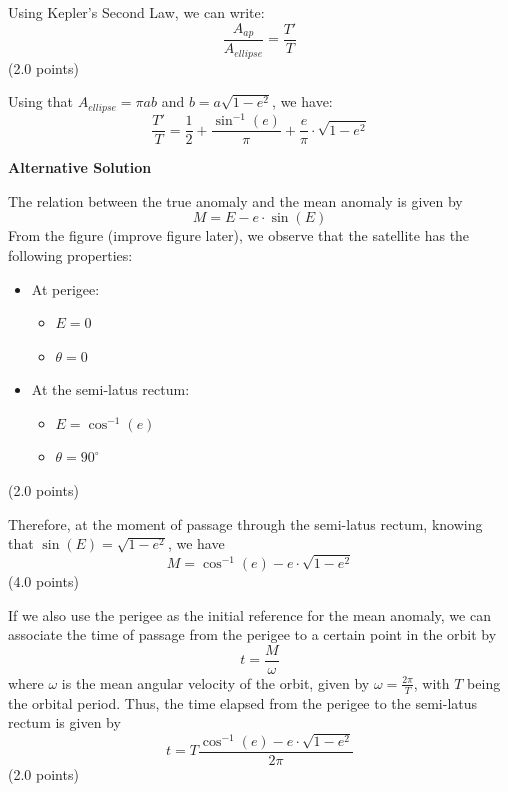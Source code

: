 \begin{description}
  Using Kepler's Second Law, we can write:
  \[
    \frac{A_{ap}}{A_{ellipse}} = \frac{T'}{T}
  \]
  \hfill(2.0 points)

  Using that $A_{ellipse} = \pi ab$ and $b = a\sqrt{1 - e^2}$, we have:
  \[
    \boxed{\frac{T'}{T} = \frac{1}{2} + \frac{\sin^{-1}(e)}{\pi}
      + \frac{e}{\pi}\cdot\sqrt{1 - e^2}}
  \]

  \textbf{Alternative Solution}


  The relation between the true anomaly and the mean anomaly is given by
  \[
    M = E - e\cdot\sin(E)
  \]
  From the figure (improve figure later), we observe that the satellite has %
  the following properties:
  \begin{itemize}
    \item At perigee:
      \begin{itemize}
        \item $E = 0$
        \item $\theta = 0$
      \end{itemize}
    \item At the semi-latus rectum:
      \begin{itemize}
        \item $E = \cos^{-1}(e)$
        \item $\theta = 90^\circ$
      \end{itemize}
  \end{itemize}
  \hfill(2.0 points)

  Therefore, at the moment of passage through the semi-latus rectum, knowing
  that $\sin(E) = \sqrt{1 - e^2}$, we have
  \[
    M = \cos^{-1}(e) - e\cdot\sqrt{1 - e^2}
  \]
  \hfill(4.0 points)

  If we also use the perigee as the initial reference for the mean anomaly, we
  can associate the time of passage from the perigee to a certain point in the
  orbit by
  \[
    t = \frac{M}{\omega}
  \]
  where $\omega$ is the mean angular velocity of the orbit, given by
  $\omega = \frac{2\pi}{T}$, with $T$ being the orbital period. Thus, the time
  elapsed from the perigee to the semi-latus rectum is given by
  \[
    t = T\frac{\cos^{-1}(e) - e\cdot\sqrt{1 - e^2}}{2\pi}
  \]
  \hfill(2.0 points)


\end{description}
